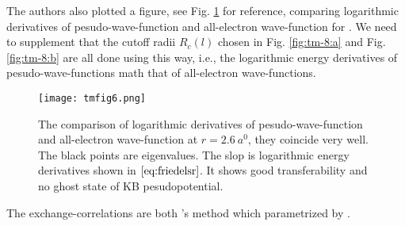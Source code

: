 The authors also plotted a figure,
see Fig. \ref{fig:tmfig6} for reference,
comparing logarithmic derivatives of pesudo-wave-function and all-electron
wave-function for . We need to supplement that the cutoff radii $R_c(l)$
chosen in Fig. \ref{fig:tm-8:a} and Fig. \ref{fig:tm-8:b} are all done using this way,
i.e., the logarithmic energy derivatives of pesudo-wave-functions math that of all-electron wave-functions.
\begin{figure}[H]
	\centering
	\texttt{[image: tmfig6.png]}
	\caption{The comparison of logarithmic derivatives of pesudo-wave-function
		and all-electron wave-function at $r = \SI{2.6}{\bohr}$, they coincide very well. The black points are eigenvalues.
		The slop is logarithmic energy derivatives shown in $\eqref{eq:friedelsr}$.
		It shows good transferability and no ghost state of KB pesudopotential.}
	\label{fig:tmfig6}
\end{figure}
The exchange-correlations are both \citeauthor{ceperley1980ground}'s method which parametrized by \citeauthor{perdew1981self}.